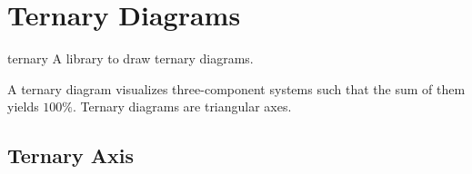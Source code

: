 
\section[libs.ternary]{Ternary Diagrams}
\begingroup
\def\pgfplotsmanualcurlibrary{ternary}

\begin{pgfplotslibrary}{ternary}
    A library to draw ternary diagrams.

    A ternary diagram visualizes three-component systems such that the sum of
    them yields $100\%$. Ternary diagrams are triangular axes.
\end{pgfplotslibrary}


\subsection{Ternary Axis}

